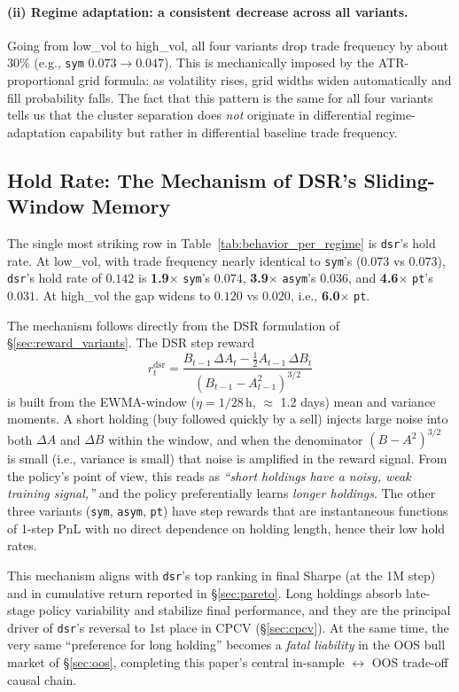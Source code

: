 \documentclass[11pt, a4paper]{article}
\begin{document}
\paragraph{(ii) Regime adaptation: a consistent decrease across all variants.}
Going from low\_vol to high\_vol, all four variants drop trade frequency by
about 30\% (e.g., \texttt{sym} $0.073 \to 0.047$). This is mechanically
imposed by the ATR-proportional grid formula: as volatility rises, grid
widths widen automatically and fill probability falls. The fact that this
pattern is the same for all four variants tells us that the cluster separation
does \emph{not} originate in differential regime-adaptation capability but
rather in differential baseline trade frequency.

\subsection{Hold Rate: The Mechanism of DSR's Sliding-Window Memory}
\label{sec:mechanism_hold_rate}

The single most striking row in Table~\ref{tab:behavior_per_regime} is
\texttt{dsr}'s hold rate. At low\_vol, with trade frequency nearly identical
to \texttt{sym}'s ($0.073$ vs $0.073$), \texttt{dsr}'s hold rate of $0.142$
is \textbf{1.9$\times$} \texttt{sym}'s $0.074$, \textbf{3.9$\times$}
\texttt{asym}'s $0.036$, and \textbf{4.6$\times$} \texttt{pt}'s $0.031$.
At high\_vol the gap widens to $0.120$ vs $0.020$, i.e., \textbf{6.0$\times$}
\texttt{pt}.

The mechanism follows directly from the DSR formulation of
\S\ref{sec:reward_variants}. The DSR step reward
\[
r_t^{\mathrm{dsr}} =
\frac{B_{t-1} \, \Delta A_t - \tfrac{1}{2} A_{t-1} \, \Delta B_t}
     {(B_{t-1} - A_{t-1}^2)^{3/2}}
\]
is built from the EWMA-window ($\eta = 1/28\,\mathrm{h}$, $\approx$ 1.2 days)
mean and variance moments. A short holding (buy followed quickly by a sell)
injects large noise into both $\Delta A$ and $\Delta B$ within the window, and
when the denominator $(B - A^2)^{3/2}$ is small (i.e., variance is small)
that noise is amplified in the reward signal. From the policy's point of
view, this reads as \emph{``short holdings have a noisy, weak training
signal,''} and the policy preferentially learns \emph{longer holdings}. The
other three variants (\texttt{sym}, \texttt{asym}, \texttt{pt}) have step
rewards that are instantaneous functions of 1-step PnL with no direct
dependence on holding length, hence their low hold rates.

This mechanism aligns with \texttt{dsr}'s top ranking in final Sharpe (at
the 1M step) and in cumulative return reported in \S\ref{sec:pareto}. Long
holdings absorb late-stage policy variability and stabilize final
performance, and they are the principal driver of \texttt{dsr}'s reversal to
1st place in CPCV (\S\ref{sec:cpcv}). At the same time, the very same
``preference for long holding'' becomes a \emph{fatal liability} in the OOS
bull market of \S\ref{sec:oos}, completing this paper's central in-sample
$\leftrightarrow$ OOS trade-off causal chain.
\end{document}
